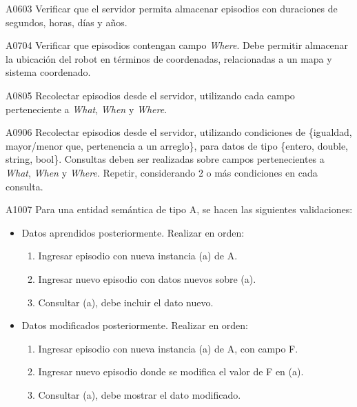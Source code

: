 \begin{def-validacion}{A}{06}{03}
	Verificar que el servidor permita almacenar episodios con duraciones de segundos, horas, días y años.	
\end{def-validacion}

\begin{def-validacion}{A}{07}{04}
	Verificar que episodios contengan campo \textit{Where}. Debe permitir almacenar la ubicación del robot en términos de coordenadas, relacionadas a un mapa y sistema coordenado.
\end{def-validacion}

\begin{def-validacion}{A}{08}{05}
	Recolectar episodios desde el servidor, utilizando cada campo perteneciente a \textit{What}, \textit{When} y \textit{Where}.
\end{def-validacion}

\begin{def-validacion}{A}{09}{06}
	Recolectar episodios desde el servidor, utilizando condiciones de \{igualdad, mayor/menor que, pertenencia a un arreglo\}, para datos de tipo \{entero, double, string, bool\}. Consultas deben ser realizadas sobre campos pertenecientes a \textit{What}, \textit{When} y \textit{Where}. Repetir, considerando 2 o más condiciones en cada consulta.
\end{def-validacion}

\begin{def-validacion}{A}{10}{07}
	Para una entidad semántica de tipo A, se hacen las siguientes validaciones:
	\begin{itemize}
		\item Datos aprendidos posteriormente. Realizar en orden:
		\begin{enumerate}
			\item Ingresar episodio con nueva instancia (a) de A.
			\item Ingresar nuevo episodio con datos nuevos sobre (a).
			\item Consultar (a), debe incluir el dato nuevo.
		\end{enumerate}
		\item Datos modificados posteriormente. Realizar en orden:
		\begin{enumerate}
			\item Ingresar episodio con nueva instancia (a) de A, con campo F.
			\item Ingresar nuevo episodio donde se modifica el valor de F en (a).
			\item Consultar (a), debe mostrar el dato modificado.
		\end{enumerate}
	\end{itemize}
\end{def-validacion}

